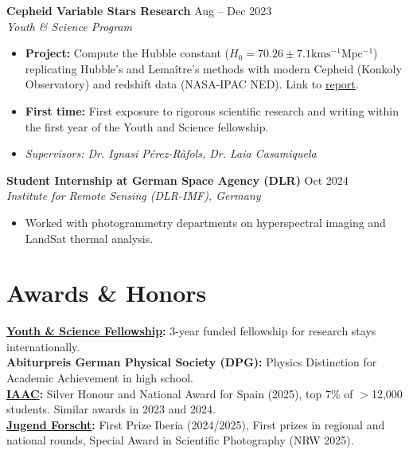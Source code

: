 \documentclass[11pt,a4paper]{article}
\begin{document}
\textbf{Cepheid Variable Stars Research} \hfill Aug -- Dec 2023 \\
\textit{Youth \& Science Program}
\begin{itemize}
	\item \textbf{Project:} Compute the Hubble constant ($H_0 = 70.26 \pm 7.1 \mathrm{kms^{-1}Mpc^{-1}}$) replicating Hubble's and Lemaître's methods with modern Cepheid (Konkoly Observatory) and redshift data (NASA-IPAC NED). Link to \href{https://joanalnu.github.io/files/Paper2023_RecomputingTheHubbleConstant.pdf}{report}.
	\item \textbf{First time:} First exposure to rigorous scientific research and writing within the first year of the Youth and Science fellowship.
	\item \textit{Supervisors: Dr. Ignasi Pérez-Ràfols, Dr. Laia Casamiquela}
\end{itemize}

\textbf{Student Internship at German Space Agency (DLR)} \hfill Oct 2024 \\
\textit{Institute for Remote Sensing (DLR-IMF), Germany}
\begin{itemize}
    \item Worked with photogrammetry departments on hyperspectral imaging and LandSat thermal analysis.
\end{itemize}

\section*{Awards \& Honors}
\textbf{\href{https://www.fundaciocatalunya-lapedrera.com/en/youth-and-science}{Youth \& Science Fellowship}:} 3-year funded fellowship for research stays internationally. \\
\textbf{Abiturpreis German Physical Society (DPG):} Physics Distinction for Academic Achievement in high school. \\
\textbf{\href{https://iaac.space}{IAAC}:} Silver Honour and National Award for Spain (2025), top 7\% of $>$12,000 students. Similar awards in 2023 and 2024. \\
\textbf{\href{https://www.jugend-forscht.de/information-in-english.html}{Jugend Forscht}:} First Prize Iberia (2024/2025), First prizes in regional and national rounds, Special Award in Scientific Photography (NRW 2025).

\end{document}
